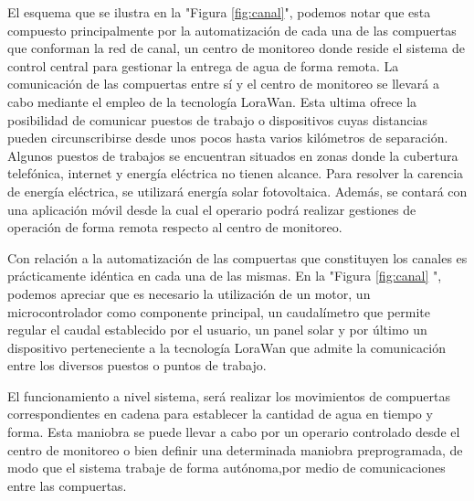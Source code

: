 El esquema que se ilustra en la "Figura \ref{fig:canal}", podemos notar que esta compuesto  principalmente por la automatización de cada una de las compuertas que conforman la red de canal, un centro de monitoreo donde reside el sistema de control central para gestionar la entrega de agua de forma remota.
La comunicación de las compuertas entre sí y el centro de monitoreo se llevará a cabo mediante el empleo de la tecnología LoraWan. Esta ultima ofrece la posibilidad de comunicar puestos de trabajo o dispositivos cuyas distancias pueden circunscribirse desde unos pocos hasta varios kilómetros  de separación. Algunos puestos de trabajos se encuentran situados en zonas donde la cubertura telefónica, internet y energía eléctrica no tienen alcance. Para resolver la carencia de energía eléctrica, se utilizará energía solar fotovoltaica. Además, se contará con una aplicación móvil desde la cual el operario podrá realizar gestiones de operación de forma remota respecto al centro de monitoreo.
         
Con relación a la automatización de las compuertas que constituyen los canales es prácticamente idéntica en cada una de las mismas. En la "Figura \ref{fig:canal} ", podemos apreciar que es necesario la utilización de un motor, un microcontrolador como componente principal, un caudalímetro que permite regular el caudal establecido por el usuario, un panel solar y por último un dispositivo perteneciente a la tecnología LoraWan que admite la comunicación entre los diversos puestos o puntos de trabajo.

El funcionamiento a nivel sistema, será realizar los movimientos de compuertas correspondientes en cadena para establecer la cantidad de agua en tiempo y forma. Esta maniobra se puede llevar a cabo por un operario controlado  desde el centro de monitoreo o bien definir una determinada maniobra preprogramada, de modo que el sistema trabaje de forma autónoma,por medio de comunicaciones entre las compuertas.  



